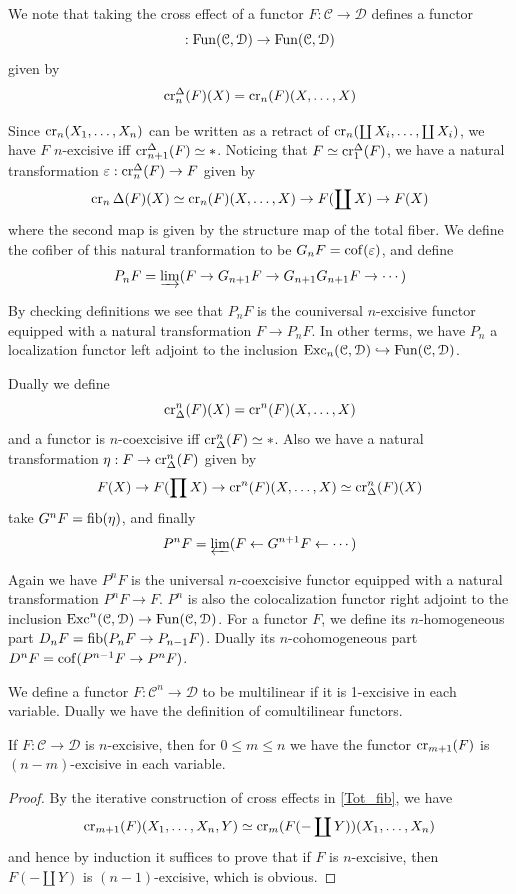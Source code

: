 	\begin{const}\label{Univ_exc_homog}
		We note that taking the cross effect of a functor $F:\mathcal{C}\to\mathcal{D}$ defines a functor
		\[ :\operatorname{\mathrm{Fun}}(\mathcal{C},\mathcal{D})\to\operatorname{\mathrm{Fun}}(\mathcal{C},\mathcal{D}) \]
		given by 
		\[ \operatorname{\mathrm{cr}}_n^\Delta(F)(X)=\operatorname{\mathrm{cr}}_n(F)(X,\dots,X) \]

		Since $\operatorname{\mathrm{cr}}_n(X_1,\dots,X_n)$ can be written as a retract of $\operatorname{\mathrm{cr}}_n(\coprod X_i,\dots,\coprod X_i)$, we have $F$ $n$-excisive iff $\operatorname{\mathrm{cr}}_{n+1}^{\Delta}(F)\simeq*$. Noticing that $F\simeq\operatorname{\mathrm{cr}}_1^\Delta(F)$, we have a natural transformation $\varepsilon:\operatorname{\mathrm{cr}}_n^\Delta(F)\to F$ given by 
		\[ \operatorname{\mathrm{cr}}_n\Delta(F)(X)\simeq\operatorname{\mathrm{cr}}_n(F)(X,\dots,X)\to F(\coprod X)\to F(X) \]
		where the second map is given by the structure map of the total fiber. We define the cofiber of this natural tranformation to be $G_nF=\operatorname{\mathrm{cof}}(\varepsilon)$, and define 
		\[ P_nF=\varinjlim(F\to G_{n+1}F\to G_{n+1}G_{n+1}F\to\cdots) \]

		By checking definitions we see that $P_nF$ is the couniversal $n$-excisive functor equipped with a natural transformation $F\to P_nF$. In other terms, we have $P_n$ a localization functor left adjoint to the inclusion $\operatorname{\mathrm{Exc}}_n(\mathcal{C},\mathcal{D})\hookrightarrow\operatorname{\mathrm{Fun}}(\mathcal{C},\mathcal{D})$. 

		Dually we define 
		\[ \operatorname{\mathrm{cr}}^n_\Delta(F)(X)=\operatorname{\mathrm{cr}}^n(F)(X,\dots,X) \]
		and a functor is $n$-coexcisive iff $\operatorname{\mathrm{cr}}^n_\Delta(F)\simeq*$. Also we have a natural transformation $\eta:F\to\operatorname{\mathrm{cr}}^n_\Delta(F)$ given by 
		\[ F(X)\to F(\prod X)\to\operatorname{\mathrm{cr}}^n(F)(X,\dots,X)\simeq\operatorname{\mathrm{cr}}^n_\Delta(F)(X) \]
		take $G^nF=\operatorname{\mathrm{fib}}(\eta)$, and finally 
		\[ P^nF=\varprojlim(F\leftarrow G^{n+1}F\leftarrow\cdots) \]

		Again we have $P^nF$ is the universal $n$-coexcisive functor equipped with a natural transformation $P^nF\to F$. $P^n$ is also the colocalization functor right adjoint to the inclusion $\operatorname{\mathrm{Exc}}^n(\mathcal{C},\mathcal{D})\to\operatorname{\mathrm{Fun}}(\mathcal{C},\mathcal{D})$. 
		For a functor $F$, we define its $n$-homogeneous part $D_nF=\operatorname{\mathrm{fib}}(P_nF\to P_{n-1}F)$. Dually its $n$-cohomogeneous part $D^nF=\operatorname{\mathrm{cof}}(P^{n-1}F\to P^nF)$. 
	\end{const}

	\begin{defn}\label{Multilinear_fun}
		We define a functor $F:\mathcal{C}^n\to\mathcal{D}$ to be multilinear if it is 1-excisive in each variable. Dually we have the definition of comultilinear functors. 
	\end{defn}

	\begin{prop}\label{Exc_cross_eff_var}
		If $F:\mathcal{C}\to\mathcal{D}$ is $n$-excisive, then for $0\leq m\leq n$ we have the functor $\operatorname{\mathrm{cr}}_{m+1}(F)$ is $(n-m)$-excisive in each variable. 
	\end{prop}
	\begin{proof}
		By the iterative construction of cross effects in \cref{Tot_fib}, we have 
		\[ \operatorname{\mathrm{cr}}_{m+1}(F)(X_1,\dots,X_n,Y)\simeq\operatorname{\mathrm{cr}}_m(F(-\coprod Y))(X_1,\dots,X_n) \] 
		and hence by induction it suffices to prove that if $F$ is $n$-excisive, then $F(-\coprod Y)$ is $(n-1)$-excisive, which is obvious. 
	\end{proof}

